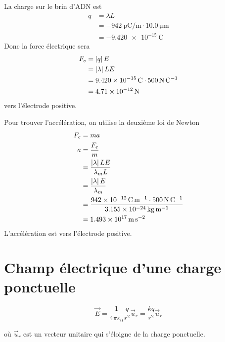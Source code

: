 \begin{reponsebox}
  La charge sur le brin d'ADN est
  \begin{align*}
    q &= \lambda L \\
      &= \SI{-942}{\pico\coulomb\per\meter} \cdot \SI{10.0}{\micro\meter} \\
      &= \SI{-9.420e-15}{\coulomb}
  \end{align*}
  Donc la force électrique sera
  \begin{align*}
    F_e &= \left| q \right| E \\
        &= \left| \lambda \right| L E  \\
        &= \SI{9.420e-15}{\coulomb} \cdot \SI{500}{\newton\per\coulomb} \\
        &= \SI{4.71e-12}{\newton}
  \end{align*}
  vers l'électrode positive.

  Pour trouver l'accélération, on utilise la deuxième loi de Newton
  \begin{align*}
    F_e &= ma  \\
    a &= \frac{F_e}{m}  \\
      &= \frac{\left| \lambda \right|LE}{\lambda_m L} \\
      &= \frac{\left| \lambda \right|E}{\lambda_m} \\
      &= \frac{\SI{942e-12}{\coulomb\per\meter} \cdot
        \SI{500}{\newton\per\coulomb}}{\SI{3.155e-24}{\kilogram\per\meter}}  \\
      &= \SI{1.493e17}{\meter\per\second\squared}
  \end{align*}
  L'accélération est vers l'électrode positive.
\end{reponsebox}


\section{Champ électrique d'une charge ponctuelle}

  $$\vec{E} = \frac{1}{4\pi\varepsilon_0}\frac{q}{r^2} \vec{u}_{r} = \frac{kq}{r^2} \vec{u}_{r}$$

  où $\vec{u}_r$ est un vecteur unitaire qui s'éloigne de la charge ponctuelle.

  \begin{center}
  \end{center}



